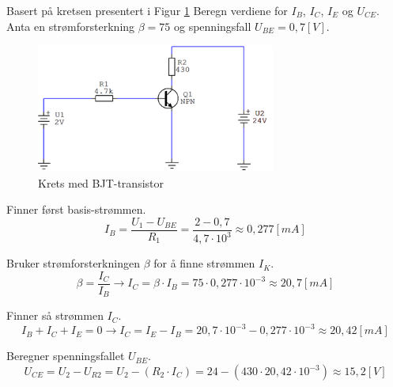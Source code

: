 \vspace{0.5cm} %


\begin{question}[name=Oppgave, topic=transBJT]
Basert på kretsen presentert i Figur \ref{fig:tranBJT1} Beregn verdiene for $I_B$, $I_C$, $I_E$ og $U_{CE}$. Anta en strømforsterkning $\beta =75$ og spenningsfall $U_{BE}=0,7[V]$.

	\begin{figure}[H]
		\centering
		\includegraphics[width=0.7\textwidth]{transistor-BJT/figurer/krets1.png}
		\caption{Krets med BJT-transistor}
		\label{fig:tranBJT1}
	\end{figure}

\end{question}

\vspace{0.5cm} %

\begin{solution}[name=Løsningsforslag oppgave]
Finner først basis-strømmen.
\[I_B=\frac{U_1-U_{BE}}{R_1}=\frac{2-0,7}{4,7\cdot 10^3}\approx 0,277 [mA]\]

Bruker strømforsterkningen $ \beta $ for å finne strømmen $I_K$.
\[\beta=\frac{I_C}{I_B} \rightarrow I_C= \beta \cdot I_B=75\cdot0,277 \cdot10^{-3} \approx 20,7[mA]\]


Finner så strømmen  $I_C$.
\[I_B+I_C+I_E=0 \rightarrow I_C=I_E-I_B=20,7\cdot 10^{-3} - 0,277 \cdot 10^{-3} \approx 20,42 [mA]\]

Beregner spenningsfallet $U_{BE}$.
\[U_{CE}=U_2-U_{R2}=U_2-(R_2 \cdot I_C) =24-(430 \cdot 20,42 \cdot 10^{-3}) \approx 15,2[V]\]

\end{solution}

\vspace{0.5cm} %

